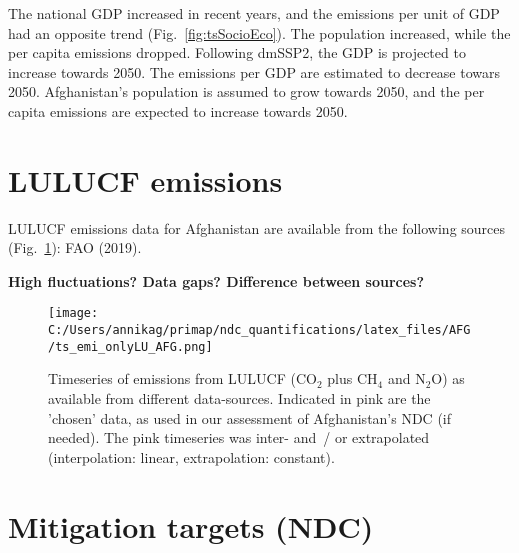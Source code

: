 \documentclass[12pt]{article}
\begin{document}
 The national GDP increased in recent years, and the emissions per unit of GDP had an opposite trend (Fig.~\ref{fig:tsSocioEco}).
 The population increased, while the per capita emissions dropped. 
 Following dmSSP2, the GDP is projected to increase towards 2050. 
 The emissions per GDP are estimated to decrease towars 2050. 
 Afghanistan's population is assumed to grow towards 2050, and the per capita emissions are expected to increase towards 2050. 

 \section{LULUCF emissions}
 \label{sec:emiLULUCF}
 LULUCF emissions data for Afghanistan are available from the following sources (Fig.~\ref{fig:tsLULUCF}): FAO (2019).

 \textbf{High fluctuations? Data gaps? Difference between sources?}
 \begin{figure}[htbp]
 \centering
 \texttt{[image: C:/Users/annikag/primap/ndc\_quantifications/latex\_files/AFG/ts\_emi\_onlyLU\_AFG.png]}
 \caption{Timeseries of emissions from LULUCF (CO$_2$ plus CH$_4$ and N$_2$O) as available from different data-sources. 
 Indicated in pink are the 'chosen' data, as used in our assessment of Afghanistan's NDC (if needed). 
 The pink timeseries was inter- and~/ or extrapolated (interpolation: linear, extrapolation: constant).}
 \label{fig:tsLULUCF}
 \end{figure}

 \section{Mitigation targets (NDC)}
 \label{sec:mitiTars}
\end{document}
